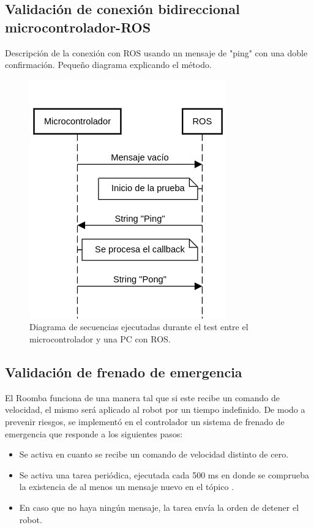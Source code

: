 \subsection{Validación de conexión bidireccional microcontrolador-ROS}

Descripción de la conexión con ROS usando un mensaje de "ping" con una doble confirmación. Pequeño diagrama explicando el método.

\begin{figure}[ht]
    \centering
    \includegraphics[scale=0.6]{./Figures/comm_test1.png}
    \caption{Diagrama de secuencias ejecutadas durante el test entre el microcontrolador y una PC con ROS.}
    \label{fig:secMicroROS}
\end{figure}

\subsection{Validación de frenado de emergencia}

El Roomba funciona de una manera tal que si este recibe un comando de velocidad, el mismo será aplicado al robot por un tiempo indefinido. De modo a prevenir riesgos, se implementó en el controlador un sistema de frenado de emergencia que responde a los siguientes pasos:

\begin{itemize}
    \item Se activa en cuanto se recibe un comando de velocidad distinto de cero.
    \item Se activa una tarea periódica, ejecutada cada 500 ms en donde se comprueba la existencia de al menos un mensaje nuevo en el tópico .
    \item En caso que no haya ningún mensaje, la tarea envía la orden de detener el robot.
\end{itemize}


